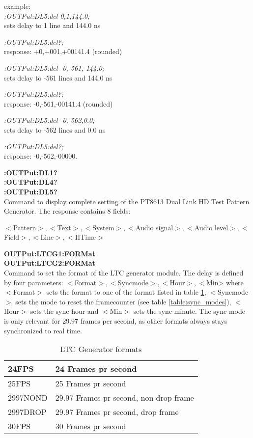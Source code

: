 example:\\
\textit{:OUTPut:DL5:del 0,1,144.0;}\\
sets delay to 1 line and 144.0 ns

\textit{:OUTPut:DL5:del?;}\\           
response: +0,+001,+00141.4 (rounded)

\textit{:OUTPut:DL5:del -0,-561,-144.0;}\\
sets delay to -561 lines and 144.0 ns

\textit{:OUTPut:DL5:del?; }\\ 
response: -0,-561,-00141.4 (rounded)

\textit{:OUTPut:DL5:del -0,-562,0.0;}\\
sets delay to -562 lines and 0.0 ns

\textit{:OUTPut:DL5:del?;}\\  
response: -0,-562,-00000.

\textbf{:OUTPut:DL1?}\\
\textbf{:OUTPut:DL4?}\\
\textbf{:OUTPut:DL5?}\\

Command to display complete setting of the PT8613 Dual Link HD Test Pattern Generator.  The response contains 8 fields:

$<$Pattern$>,<$Text$>,<$System$>,<$Audio signal$>,<$Audio level$>,<$Field$>,<$Line$>,<$HTime$>$



\textbf{OUTPut:LTCG1:FORMat}\\
\textbf{OUTPut:LTCG2:FORMat}\\
Command to set the format of the LTC generator module. The delay is defined by four parameters: $<$Format$>,<$Syncmode$>,<$Hour$>,<$Min>
where $<$Format$>$ sets the format to one of the format listed in table \ref{table:LTC_formats}, $<$Syncmode$>$ sets the mode to reset the framecounter (see table \ref{table:sync_modes}), $<$Hour$>$ sets the sync hour and $<$Min$>$ sets the sync minute. The sync mode is only relevant for 29.97 frames per second, as other formats always stays synchronized to real time.

\begin{table}[hbt]
\centering

\begin{tabular}{|l|l|}
\hline
24FPS	& 24 Frames pr second \\ \hline
25FPS	&	25 Frames pr second \\ \hline
2997NOND & 29.97 Frames pr second, non drop frame \\ \hline
2997DROP & 29.97 Frames pr second, drop frame \\ \hline
30FPS & 30 Frames pr second \\ \hline
\end{tabular}

\caption{LTC Generator formats}
\label{table:LTC_formats}

\end{table}

